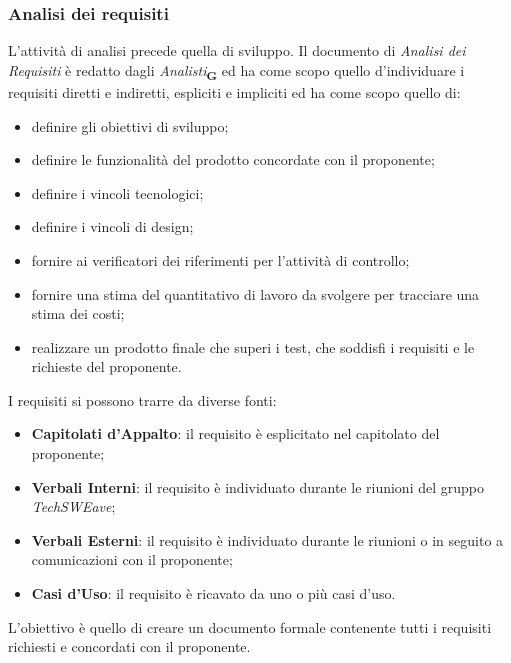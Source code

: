 \subsubsection{Analisi dei requisiti}
L'attività di analisi precede quella di sviluppo. Il documento di \textit{Analisi dei Requisiti} è redatto dagli \textit{Analisti}\textsubscript{\textbf{G}} ed ha come scopo quello d'individuare i requisiti diretti e indiretti, espliciti e impliciti ed ha come scopo quello di:
\begin{itemize}
    \item definire gli obiettivi di sviluppo;
    \item definire le funzionalità del prodotto concordate con il proponente;
    \item definire i vincoli tecnologici;
    \item definire i vincoli di design;
    \item fornire ai verificatori dei riferimenti per l'attività di controllo;
    \item fornire una stima del quantitativo di lavoro da svolgere per tracciare una stima dei costi;
    \item realizzare un prodotto finale che superi i test, che soddisfi i requisiti e le richieste del proponente.
\end{itemize}
I requisiti si possono trarre da diverse fonti:
\begin{itemize}
    \item \textbf{Capitolati d'Appalto}: il requisito è esplicitato nel capitolato del proponente;
    \item \textbf{Verbali Interni}: il requisito è individuato durante le riunioni del gruppo \textit{TechSWEave};
    \item \textbf{Verbali Esterni}: il requisito è individuato durante le riunioni o in seguito a comunicazioni con il proponente;
    \item \textbf{Casi d'Uso}: il requisito è ricavato da uno o più casi d'uso.
\end{itemize}
L'obiettivo è quello di creare un documento formale contenente tutti i requisiti richiesti e concordati con il proponente.

